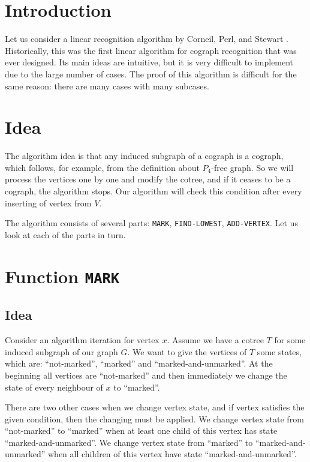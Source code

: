 
\section{Introduction}
Let us consider a linear recognition algorithm by Corneil, Perl, and Stewart \cite{corneil_perl_stewart_85}. Historically, this was the first linear algorithm for cograph recognition that was ever designed. Its main ideas are intuitive, but it is very difficult to implement due to the large number of cases. The proof of this algorithm is difficult for the same reason: there are many cases with many subcases.
\section{Idea}

The algorithm idea is that any induced subgraph of a cograph is a cograph, which follows, for example, from the definition about $P_4$-free graph. So we will process the vertices one by one and modify the cotree, and if it ceases to be a cograph, the algorithm stops. Our algorithm will check this condition after every inserting of vertex from $V$.

The algorithm consists of several parts: \texttt{MARK}, \texttt{FIND-LOWEST}, \texttt{ADD-VERTEX}. Let us look at each of the parts in turn.

\section{Function \texttt{MARK}}
\subsection{Idea}
Consider an algorithm iteration for vertex $x$. Assume we have a cotree $T$ for some induced subgraph of our graph $G$. We want to give the vertices of $T$ some states, which are: ``not-marked'', ``marked'' and ``marked-and-unmarked''. At the beginning all vertices are ``not-marked'' and then immediately we change the state of every neighbour of $x$ to ``marked''. 

There are two other cases when we change vertex state, and if vertex satisfies the given condition, then the changing must be applied. We change vertex state from ``not-marked'' to ``marked'' when at least one child of this vertex has state ``marked-and-unmarked''. We change vertex state from ``marked'' to ``marked-and-unmarked'' when all children of this vertex have state ``marked-and-unmarked''. 


